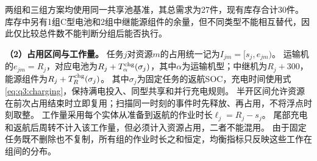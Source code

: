 两组和三组方案均使用同一共享池基准，其总需求为27件，现有库存合计30件。
库存中另有1组C型电池和2组中继能源组件的余量，但不同类型不能相互替代，因此仅比较总件数不能判断分组后能否执行。

\textbf{（2）占用区间与工作量。}
任务$j$对资源$m$的占用统一记为$I_{jm}=[s_j,e_{jm})$。
运输机的$e_{jm}=R_j$，对应电池为$R_j+T_{\alpha}^{\rm chg}(\sigma_j)$，其中$\alpha$为运输机型；中继机为$R_j+300$，能源组件为$R_j+T_R^{\rm chg}(\sigma_j)$。
其中$\sigma_j$为固定任务的返航SOC，充电时间使用式\eqref{eq:q3:charging}，保持满电投入、同型共享和并行充电规则。
半开区间允许资源在前次占用结束时立即复用；扫描同一时刻的事件时先释放、再占用，不将浮点时刻取整。
工作量采用每个实体从准备到返航的作业时长$\ell_j=R_j-s_j$。
尾部充电和返航后周转不计入该工作量，但必须计入资源占用，二者不能混用。
由于固定任务既不删除也不复制，所有组的作业时长之和恒定，均衡指标只反映这些工作在组间的分布。
